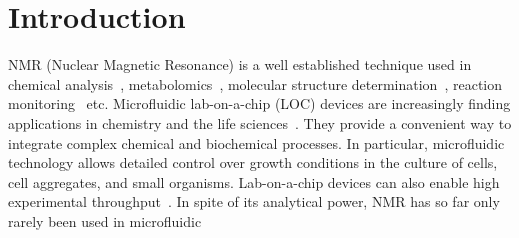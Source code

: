 \documentclass[preprint,12pt]{article}
\begin{document}
\section{Introduction}	
\label{sec:intro}
NMR (Nuclear Magnetic Resonance) is a well established technique used in chemical 
analysis~\cite{NMR-chemical-1995, hills1994magnetic, rabenstein1991quantitative}, 
metabolomics~\cite{nmr-metabolomics-future-2017,nmr-metabolomics-2016}, molecular 
structure determination~\cite{wuthrich1990protein}, reaction 
monitoring~\cite{maiwald2004quantitative} etc. Microfluidic lab-on-a-chip (LOC) devices 
are increasingly finding applications in chemistry and the life 
sciences~\cite{whitesides2006origins,mark2010microfluidic}. 
They provide a convenient way to integrate complex chemical and biochemical processes. 
In particular, microfluidic technology allows detailed control over growth conditions 
in the culture of cells, cell aggregates, and small organisms. 
Lab-on-a-chip devices can also enable high experimental 
throughput~\cite{cellonchip-2006,cellonchip-review,tissueonchip-2008}. 
In spite of its analytical power, NMR has so far only rarely been used in microfluidic 
\end{document}
